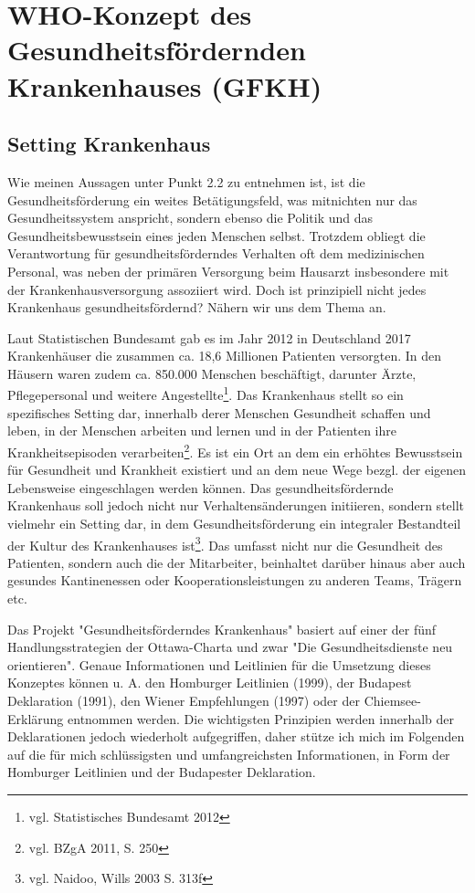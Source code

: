 \section{WHO-Konzept des Gesundheitsfördernden Krankenhauses (GFKH)}
\label{sec:WHOKonzeptDesGesundheitsförderndenKrankenhausesGFKH}

\subsection{Setting Krankenhaus}
\label{sec:SettingKrankenhaus}

Wie meinen Aussagen unter Punkt 2.2 zu entnehmen ist, ist die Gesundheitsförderung ein weites Betätigungsfeld, was mitnichten nur das Gesundheitssystem anspricht, sondern ebenso die Politik und das Gesundheitsbewusstsein eines jeden Menschen selbst. Trotzdem obliegt die Verantwortung für gesundheitsförderndes Verhalten oft dem medizinischen Personal, was neben der primären Versorgung beim Hausarzt insbesondere mit der  Krankenhausversorgung assoziiert wird. Doch ist prinzipiell nicht jedes Krankenhaus gesundheitsfördernd? Nähern wir uns dem Thema an.

Laut Statistischen Bundesamt gab es im Jahr 2012 in Deutschland 2017 Krankenhäuser die zusammen ca. 18,6 Millionen Patienten versorgten. In den Häusern waren zudem ca. 850.000 Menschen beschäftigt, darunter Ärzte, Pflegepersonal und weitere Angestellte\footnote{vgl. Statistisches Bundesamt 2012}. Das Krankenhaus stellt so ein spezifisches Setting dar, innerhalb derer Menschen Gesundheit schaffen und leben, in der Menschen arbeiten und lernen und in der Patienten ihre Krankheitsepisoden verarbeiten\footnote{vgl. BZgA 2011, S. 250}. Es ist ein Ort an dem ein erhöhtes Bewusstsein für Gesundheit und Krankheit existiert und an dem neue Wege bezgl. der eigenen Lebensweise eingeschlagen werden können. Das gesundheitsfördernde Krankenhaus soll jedoch nicht nur Verhaltensänderungen initiieren, sondern stellt vielmehr ein Setting dar, in dem Gesundheitsförderung ein integraler Bestandteil der Kultur des Krankenhauses ist\footnote{vgl. Naidoo, Wills 2003 S. 313f}. Das umfasst nicht nur die Gesundheit des Patienten, sondern auch die der Mitarbeiter, beinhaltet darüber hinaus aber auch gesundes Kantinenessen oder Kooperationsleistungen zu anderen Teams, Trägern etc.

Das Projekt "Gesundheitsförderndes Krankenhaus" basiert auf einer der fünf Handlungsstrategien der Ottawa-Charta und zwar "Die Gesundheitsdienste neu orientieren". 
Genaue Informationen und Leitlinien für die Umsetzung dieses Konzeptes können u. A. den Homburger Leitlinien (1999), der Budapest Deklaration (1991), den Wiener Empfehlungen (1997) oder der Chiemsee-Erklärung entnommen werden. Die wichtigsten Prinzipien werden innerhalb der Deklarationen jedoch wiederholt aufgegriffen, daher stütze ich mich im Folgenden auf die für mich schlüssigsten und  umfangreichsten Informationen, in Form der Homburger Leitlinien und der Budapester Deklaration. 

